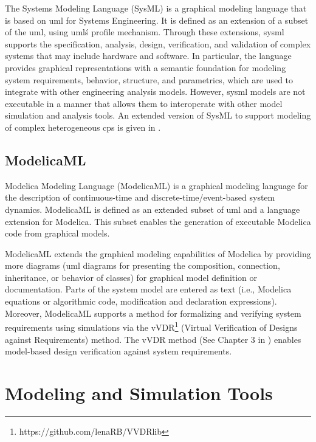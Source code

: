 The Systems Modeling Language (SysML) \cite{sysml} is a graphical modeling language that is based on \acrshort{uml} for Systems Engineering. It is defined as an extension of a subset of the \acrshort{uml}, using \acrshort{uml}\'s profile mechanism. Through these extensions, \acrshort{sysml} supports the specification, analysis, design, verification, and validation of complex systems that may include hardware and software. In particular, the language provides graphical representations with a semantic foundation for modeling system requirements, behavior, structure, and parametrics, which are used to integrate with other engineering analysis models. However, \acrshort{sysml} models are not executable in a manner that allows them to interoperate with other model simulation and analysis tools. An extended version of SysML to support modeling of complex heterogeneous \acrshort{cps} is given in \cite{mbsdjensen}. 

\subsection{ModelicaML}
\label{sec:modelicaml}

Modelica Modeling Language (ModelicaML) \cite{modelicaml, modelicamlreport} is a graphical modeling language for the description of continuous-time and discrete-time/event-based system dynamics. ModelicaML is defined as an extended subset of \acrshort{uml} and a language extension for Modelica. This subset enables the generation of executable Modelica code from graphical models.

ModelicaML extends the graphical modeling capabilities of Modelica by providing more diagrams (\acrshort{uml} diagrams for presenting the composition, connection, inheritance, or behavior of classes) for graphical model definition or documentation. Parts of the system model are entered as text (i.e., Modelica equations or algorithmic code, modification and declaration expressions). Moreover, ModelicaML supports a method for formalizing and verifying system requirements using simulations via the vVDR\footnote{https://github.com/lenaRB/VVDRlib} (Virtual Verification of Designs against Requirements) method. The vVDR method (See Chapter 3 in \cite{modelicamlwladimir, modelicamlverification}) enables model-based design verification against system requirements.


\section{Modeling and Simulation Tools}
\label{sec:tools}

